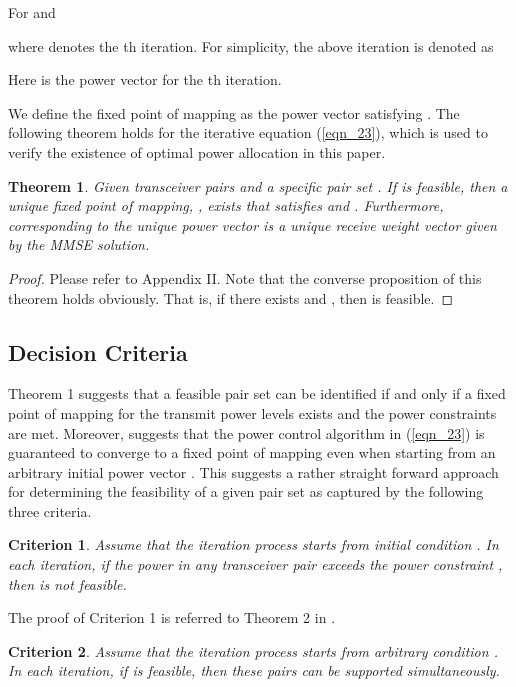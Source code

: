 \documentclass[draftcls,onecolumn,peerview,12pt]{IEEEtran}
\begin{document}
For  and 


where  denotes the th iteration. For simplicity, the above
iteration is denoted as


Here  is the power vector for the th iteration.

We define the fixed point of mapping as the power vector
 satisfying . The following theorem holds for the
iterative equation (\ref{eqn_23}), which is used to verify the
existence of optimal power allocation in this paper.

\newtheorem{theorem}{Theorem}
\begin{theorem}
Given  transceiver pairs and a specific pair set . If 
is feasible, then a unique fixed point of mapping, , exists that satisfies  and . Furthermore,
corresponding to the unique power vector  is a
unique receive weight vector  given by the
MMSE solution.
\end{theorem}

\begin{proof}
Please refer to Appendix II. Note that the converse proposition of
this theorem holds obviously. That is, if there exists
 and
, then  is feasible.
\end{proof}



\subsection{Decision Criteria}
Theorem 1 suggests that a feasible pair set can be identified if and
only if a fixed point of mapping for the transmit power levels
exists and the power constraints are met. Moreover,
\cite{13_JointOptimal1998} suggests that the power control algorithm
in (\ref{eqn_23}) is guaranteed to converge to a fixed point of
mapping even when starting from an arbitrary initial power vector
. This suggests a rather straight forward approach
for determining the feasibility of a given pair set  as
captured by the following three criteria.

\newtheorem{criterion}{Criterion}
\begin{criterion}
Assume that the iteration process starts from initial condition
. In each iteration, if the power in any
transceiver pair exceeds the power constraint , then  is
not feasible.
\end{criterion}

The proof of Criterion 1 is referred to Theorem 2 in
\cite{13_JointOptimal1998}.

\begin{criterion}
Assume that the iteration process starts from arbitrary condition
. In each iteration, if  is
feasible, then these pairs can be supported simultaneously.
\end{criterion}
\end{document}
